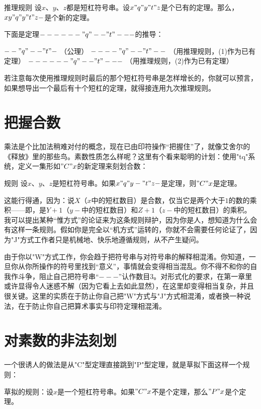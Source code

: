 \begin{thm}{推理规则}
设$x$、$y$、$z$都是短杠符号串。设$x"q"y"t"z$是个已有的定理。那么，$xy"q"y"t"z-$是个新的定理。
\end{thm}
下面是定理$------"q"--"t"---$的推导：
\begin{enumerate}
\aitem $--"q"--"t"-$       \>（公理）
\aitem $----"q"--"t"--$    \>（用推理规则，(1)作为已有定理）
\aitem $------"q"--"t"---$ \>（用推理规则，(2)作为已有定理）
\end{enumerate}
若注意每次使用推理规则时最后的那个短杠符号串是怎样增长的，你就可以预言，如果想导出一个最后有十个短杠的定理，就得接连用九次推理规则。

\section{把握合数}

乘法是个比加法稍难对付的概念，现在已由印符操作“把握住”了，就像艾舍尔的《释放》里的那些鸟。素数性质怎么样呢？这里有个看来聪明的计划：使用"tq"系统，定义一集形如$"C"x$的新定理来刻划合数：
\begin{thm}{规则}
设$x$、$y$、$z$是短杠符号串。如果$x"q"y-"t"z-$是定理，则$"C"x$是定理。
\end{thm}

这能行得通，因为：说$X$（$x$中的短杠数目）是合数，仅当它是两个大于$1$的数的乘积——即，是$Y+1$（$y-$中的短杠数目）和$Z+1$（$z-$中的短杠数目）的乘积。我可以提出某种“惟方式”的论证来为这条规则辩护，因为你是人，想知道为什么会有这样一条规则。假如你是完全以“机方式”运转的，你就不会需要任何论证了，因为"J"方式工作者只是机械地、快乐地遵循规则，从不产生疑问。

由于你以"W"方式工作，你会趋于把符号串与对符号串的解释相混淆。你知道，一旦你从你所操作的符号里找到“意义”，事情就会变得相当混乱。你不得不和你的自我作斗争，阻止自己把符号串“$---$”认作数目$3$。对形式化的要求，在第一章里或许显得令人迷惑不解（因为它看上去如此显然），在这里却变得相当复杂，并且很关键。这里的实质在于防止你自己把"W"方式与"J"方式相混淆，或者换一种说法，在于防止你自己把算术事实与印符定理相混淆。

\section{对素数的非法刻划}

一个很诱人的做法是从"C"型定理直接跳到"P"型定理，就是草拟下面这样一个规则：

草拟的规则：设$x$是一个短杠符号串。如果$"C"x$不是个定理，那么$"P"x$是个定理。

